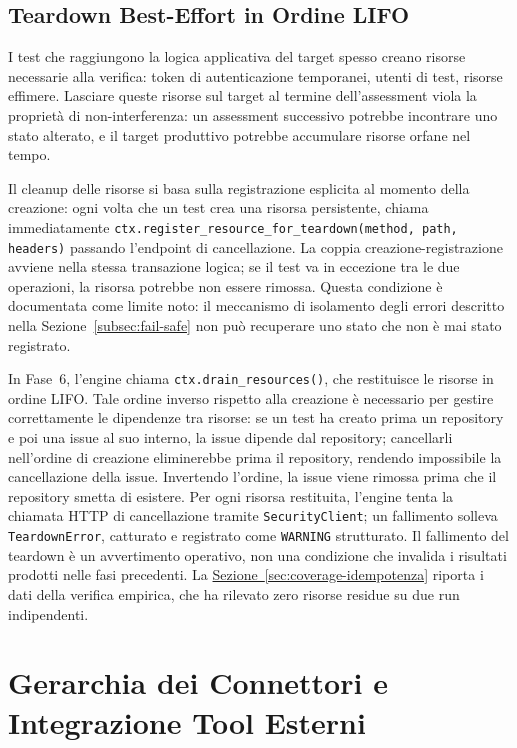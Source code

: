 \subsection{Teardown Best-Effort in Ordine LIFO}\label{subsec:teardown}

I test che raggiungono la logica applicativa del target spesso creano risorse necessarie alla verifica: token di autenticazione temporanei, utenti di test, risorse effimere. Lasciare queste risorse sul target al termine dell'assessment viola la proprietà di non-interferenza: un assessment successivo potrebbe incontrare uno stato alterato, e il target produttivo potrebbe accumulare risorse orfane nel tempo.

Il cleanup delle risorse si basa sulla registrazione esplicita al momento della creazione: ogni volta che un test crea una risorsa persistente, chiama immediatamente \texttt{ctx.register\_resource\_for\_teardown(method, path, headers)} passando l'endpoint di cancellazione. La coppia creazione-registrazione avviene nella stessa transazione logica; se il test va in eccezione tra le due operazioni, la risorsa potrebbe non essere rimossa. Questa condizione è documentata come limite noto: il meccanismo di isolamento degli errori descritto nella Sezione~\ref{subsec:fail-safe} non può recuperare uno stato che non è mai stato registrato.

In Fase~6, l'engine chiama \texttt{ctx.drain\_resources()}, che restituisce le risorse in ordine \gls{LIFO}. Tale ordine inverso rispetto alla creazione è necessario per gestire correttamente le dipendenze tra risorse: se un test ha creato prima un repository e poi una issue al suo interno, la issue dipende dal repository; cancellarli nell'ordine di creazione eliminerebbe prima il repository, rendendo impossibile la cancellazione della issue. Invertendo l'ordine, la issue viene rimossa prima che il repository smetta di esistere. Per ogni risorsa restituita, l'engine tenta la chiamata \gls{HTTP} di cancellazione tramite \texttt{SecurityClient}; un fallimento solleva \texttt{TeardownError}, catturato e registrato come \texttt{WARNING} strutturato. Il fallimento del teardown è un avvertimento operativo, non una condizione che invalida i risultati prodotti nelle fasi precedenti. La \hyperref[sec:coverage-idempotenza]{Sezione~\ref*{sec:coverage-idempotenza}} riporta i dati della verifica empirica, che ha rilevato zero risorse residue su due run indipendenti.

\section{Gerarchia dei Connettori e Integrazione Tool Esterni}%
\label{sec:connectors}

